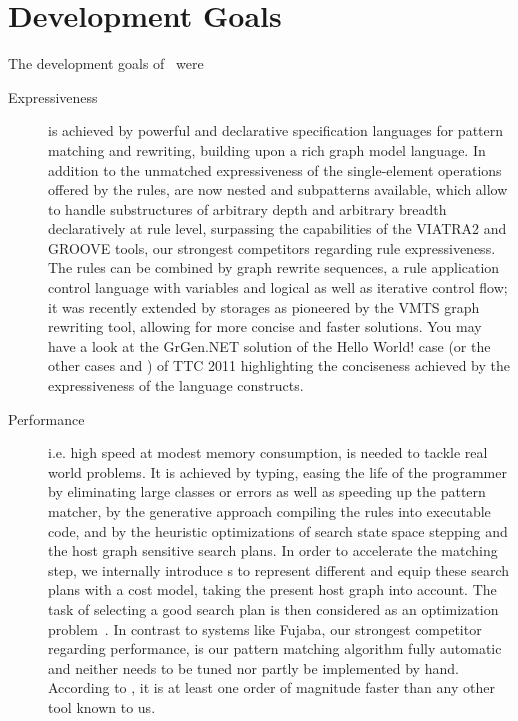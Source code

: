 \section{Development Goals}

The development goals of \GrG\ were

\begin{description}

\item[Expressiveness]
is achieved by powerful and declarative specification languages for pattern matching and rewriting, building upon a rich graph model language.
In addition to the unmatched expressiveness of the single-element operations offered by the rules,
are now nested and subpatterns available, which allow to handle substructures of arbitrary depth and arbitrary breadth declaratively at rule level,
surpassing the capabilities of the VIATRA2\cite{viatra2,recursiveviatra} and GROOVE \cite{Groove} tools, our strongest competitors regarding rule expressiveness.
The rules can be combined by graph rewrite sequences, a rule application control language with variables and logical as well as iterative control flow;
it was recently extended by storages as pioneered by the VMTS\cite{vmts} graph rewriting tool, allowing for more concise and faster solutions.
You may have a look at the GrGen.NET solution of the Hello World! case \cite{HelloWorld} (or the other cases \cite{ProgramUnderstanding} and \cite{CompilerOptimization}) of TTC 2011 highlighting the conciseness achieved by the expressiveness of the language constructs.

\item[Performance]
i.e. high speed at modest memory consumption, is needed to tackle real world problems.
It is achieved by typing, easing the life of the programmer by eliminating large classes or errors as well as speeding up the pattern matcher,
by the generative approach compiling the rules into executable code,
and by the heuristic optimizations of search state space stepping and the host graph sensitive search plans.
In order to accelerate the matching step, we internally introduce s
to represent different  and equip these search plans with a cost model, taking the present host graph into account.
The task of selecting a good search plan is then considered as an optimization problem~\cite{BKG:07,Bat:06}.
In contrast to systems like Fujaba\cite{fujaba,fuj}, our strongest competitor regarding performance,
is our pattern matching algorithm fully automatic and neither needs to be tuned nor partly be implemented by hand.
According to \cite{varro_bench}, it is at least one order of magnitude faster than any other tool known to us.


\end{description}
